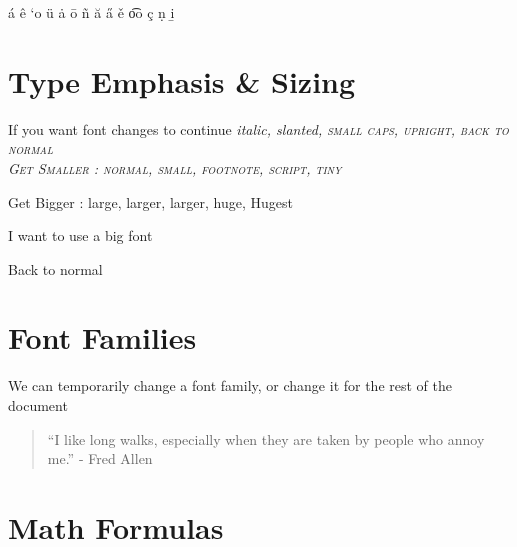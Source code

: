 \documentclass[a4paper,12pt]{book}
\begin{document}
\'{a} \^{e} `{o} \"{u} \.{a} \={o} \~{n} \u{a} \H{a} \v{e} \t{oo} \c{c} \d{n} \b{i}



\section[Type]{\textsf{Type Emphasis \& Sizing}} \label{sec:typeemp}

If you want font changes to continue \itshape italic, \slshape slanted, \scshape small caps, \upshape upright, \normalfont back to normal\\

Get Smaller : \normalsize{normal}, \small{small}, \footnotesize{footnote}, \scriptsize{script}, \tiny{tiny}

Get Bigger : \large{large}, \Large{larger}, \LARGE{larger}, \huge{huge}, \Huge{Hugest}

\begin{LARGE}
I want to use a big font
\end{LARGE}

\normalsize{Back to normal}

\section{\textsf{Font Families}}
We can {\sffamily temporarily change} a font family, \ttfamily or change it for the rest of the document \sffamily

\begin{quote}
``I like long walks, especially when they are taken by people who annoy me.'' 
- Fred Allen
\end{quote} 

\section{Math Formulas}
\end{document}
